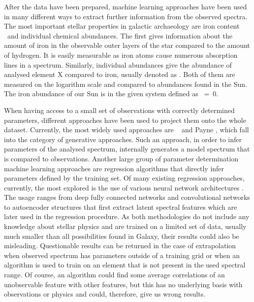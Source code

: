 After the data have been prepared, machine learning approaches have been used in many different ways to extract further information from the observed spectra. The most important stellar properties in galactic archaeology are iron content \Feh\ and individual chemical abundances. The first gives information about the amount of iron in the observable outer layers of the star compared to the amount of hydrogen. It is easily measurable as iron atoms cause numerous absorption lines in a spectrum. Similarly, individual abundances give the abundance of analysed element X compared to iron, usually denoted as \Xfe. Both of them are measured on the logarithm scale and compared to abundances found in the Sun. The iron abundance of our Sun is in the given system defined as \Feh~=~0.

When having access to a small set of observations with correctly determined parameters, different approaches have been used to project them onto the whole dataset. Currently, the most widely used approaches are \TC\ \cite{2015ApJ...808...16N, buder2018} and Payne \cite{2019ApJ...879...69T}, which fall into the category of generative approaches. Such an approach, in order to infer parameters of the analysed spectrum, internally generates a model spectrum that is compared to observations. Another large group of parameter determination machine learning approaches are regression algorithms that directly infer parameters defined by the training set. Of many existing regression approaches, currently, the most explored is the use of various neural network architectures \cite{2015MNRAS.452..158Y, 2019MNRAS.483.3255L, 2020ApJ...891...23W, 2020arXiv200208390O}. The usage ranges from deep fully connected networks and convolutional networks to autoencoder structures that first extract latent spectral features which are later used in the regression procedure. As both methodologies do not include any knowledge about stellar physics and are trained on a limited set of data, usually much smaller than all possibilities found in Galaxy, their results could also be misleading. Questionable results can be returned in the case of extrapolation when observed spectrum has parameters outside of a training grid or when an algorithm is used to train on an element that is not present in the used spectral range. Of course, an algorithm could find some average correlations of an unobservable feature with other features, but this has no underlying basis with observations or physics and could, therefore, give us wrong results.

